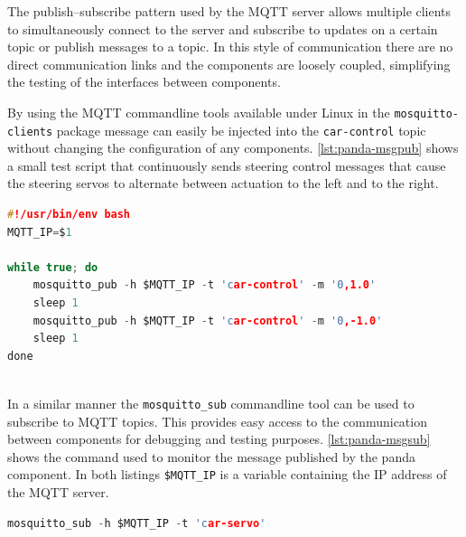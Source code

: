 The publish–subscribe pattern used by the MQTT server allows multiple clients to simultaneously connect to the server and subscribe to updates on a certain topic or publish messages to a topic.
In this style of communication there are no direct communication links and the components are loosely coupled, simplifying the testing of the interfaces between components.

By using the MQTT commandline tools available under Linux in the \texttt{mosquitto-clients} package message can easily be injected into the \texttt{car-control} topic without changing the configuration of any components.
\autoref{lst:panda-msgpub} shows a small test script that continuously sends steering control messages that cause the steering servos to alternate between actuation to the left and to the right. \\ %

\begin{minipage}{\linewidth}
\begin{lstlisting}[style=mylistings, language=c, label=lst:panda-msgpub, caption=Injecting steering commands over MQTT]
#!/usr/bin/env bash
MQTT_IP=$1

while true; do
	mosquitto_pub -h $MQTT_IP -t 'car-control' -m '0,1.0'
	sleep 1
	mosquitto_pub -h $MQTT_IP -t 'car-control' -m '0,-1.0'
	sleep 1
done
\end{lstlisting}
\end{minipage} \\

In a similar manner the \texttt{mosquitto\_sub} commandline tool can be used to subscribe to MQTT topics. This provides easy access to the communication between components for debugging and testing purposes.
\autoref{lst:panda-msgsub} shows the command used to monitor the message published by the panda component. In both listings \texttt{\$MQTT\_IP} is a variable containing the IP address of the MQTT server. \\

\begin{minipage}{\linewidth}
\begin{lstlisting}[style=mylistings, language=c, label=lst:panda-msgsub, caption=Subscribing to MQTT topics]
mosquitto_sub -h $MQTT_IP -t 'car-servo'
\end{lstlisting}
\end{minipage} \\
